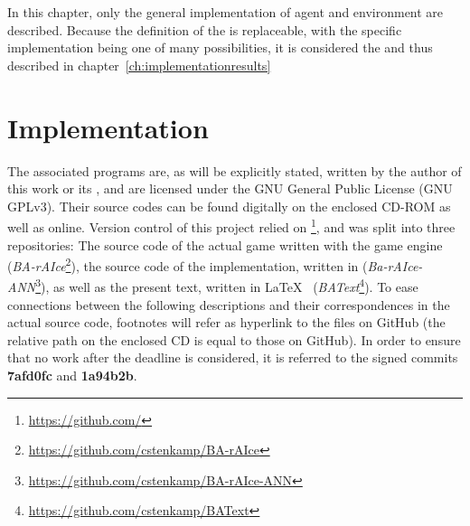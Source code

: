 \noindent In this chapter, only the general implementation of agent and environment are described. Because the definition of the  is replaceable, with the specific implementation being one of many possibilities, it is considered the  and thus described in chapter~\ref{ch:implementationresults}

\section{Implementation}

\label{ch:implementation}

The associated programs are, as will be explicitly stated, written by the author of this work or its \leonbase, and are licensed under the GNU General Public License (GNU GPLv3). Their source codes can be found digitally on the enclosed CD-ROM as well as online. Version control of this project relied on \footnote{\url{https://github.com/}}, and was split into three repositories: The source code of the actual game written with the game engine  (\textit{BA-rAIce}\footnote{\url{https://github.com/cstenkamp/BA-rAIce}}), the source code of the implementation, written in  (\textit{Ba-rAIce-ANN}\footnote{\url{https://github.com/cstenkamp/BA-rAIce-ANN}}), as well as the present text, written in \LaTeX ~ (\textit{BAText}\footnote{\url{https://github.com/cstenkamp/BAText}}). To ease connections between the following descriptions and their correspondences in the actual source code, footnotes will refer as hyperlink to the files on GitHub (the relative path on the enclosed CD is equal to those on GitHub). In order to ensure that no work after the deadline is considered, it is referred to the signed commits \textbf{7afd0fc} and \textbf{1a94b2b}.

